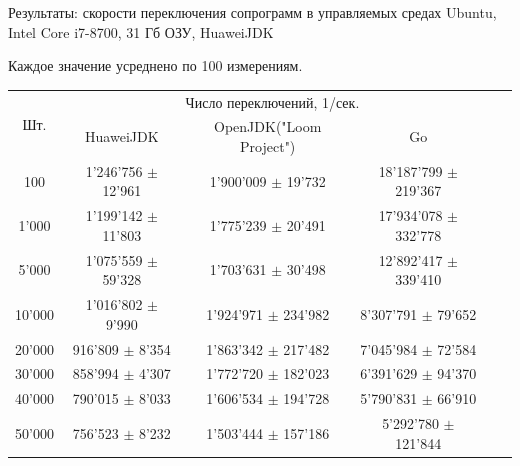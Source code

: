 \begin{frame}{Результаты: скорости переключения сопрограмм в управляемых средах}
	Ubuntu, Intel Core i7-8700, 31 Гб ОЗУ, HuaweiJDK
	\par Каждое значение усреднено по 100 измерениям. 
	
	\begin{table}[H]
		\begin{tabular}{|c|c|c|c|c|c|}
			\hline \multirow{2}{*}{Шт.} & \multicolumn{3}{|c|}{Число переключений, 1/сек.}                        \\
			\cline{2-4}     & HuaweiJDK                & OpenJDK("Loom Project")     & Go                         \\
			\hline 100      & 1'246'756 $\pm$ 12'961 & 1'900'009 $\pm$ 19'732    & 18'187'799 $\pm$ 219'367 \\
			\hline 1'000    & 1'199'142 $\pm$ 11'803 & 1'775'239 $\pm$ 20'491    & 17'934'078 $\pm$ 332'778 \\
			\hline 5'000    & 1'075'559 $\pm$ 59'328 & 1'703'631 $\pm$ 30'498    & 12'892'417 $\pm$ 339'410 \\  
			\hline 10'000   & 1'016'802 $\pm$ 9'990  & 1'924'971 $\pm$ 234'982   & 8'307'791 $\pm$ 79'652   \\  
			\hline 20'000   & 916'809 $\pm$ 8'354    & 1'863'342 $\pm$ 217'482   & 7'045'984 $\pm$ 72'584   \\ 
			\hline 30'000   & 858'994 $\pm$ 4'307    & 1'772'720 $\pm$ 182'023   & 6'391'629 $\pm$ 94'370   \\ 
			\hline 40'000   & 790'015 $\pm$ 8'033    & 1'606'534 $\pm$ 194'728 	 & 5'790'831 $\pm$ 66'910	  \\ 
			\hline 50'000   & 756'523 $\pm$ 8'232    & 1'503'444 $\pm$ 157'186   & 5'292'780 $\pm$ 121'844  \\  
			\hline 
		\end{tabular}
	\end{table}	
\end{frame}


